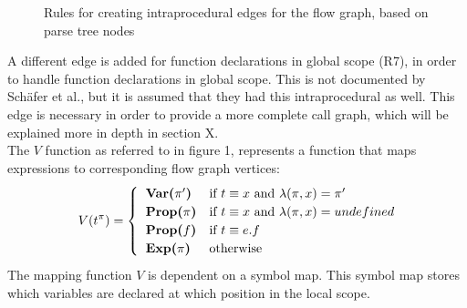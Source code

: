 \documentclass[journal,10pt]{IEEEtran}
\begin{document}
\begin{figure}[H]
\hspace*{-.4cm}
\caption{Rules for creating intraprocedural edges for the flow graph, based on parse tree nodes}
\end{figure}

A different edge is added for function declarations in global scope (R7), in order to handle function declarations in global scope. This is not documented by Sch\"{a}fer et al., but it is assumed that they had this intraprocedural as well. This edge is necessary in order to provide a more complete call graph, which will be explained more in depth in section X. \\ %

The $V$ function as referred to in figure 1, represents a function that maps expressions to corresponding flow graph vertices:
\begin{equation*}
  V(t^\pi) = \begin{cases}
    \hspace*{0.2cm} \textbf{Var($\pi'$)} & \text{if~} t \equiv x \text{~and~} \lambda(\pi, x) = \pi' \\
    \hspace*{0.2cm} \textbf{Prop($\pi$)} & \text{if~} t \equiv x \text{~and~} \lambda(\pi, x) = undefined\\
    \hspace*{0.2cm} \textbf{Prop($f$)} & \text{if~} t \equiv e.f \\
    \hspace*{0.2cm} \textbf{Exp($\pi$)} &\text{otherwise}
  \end{cases}
\end{equation*}
The mapping function $V$ is dependent on a symbol map. This symbol map stores which variables are declared at which position in the local scope.
\end{document}
